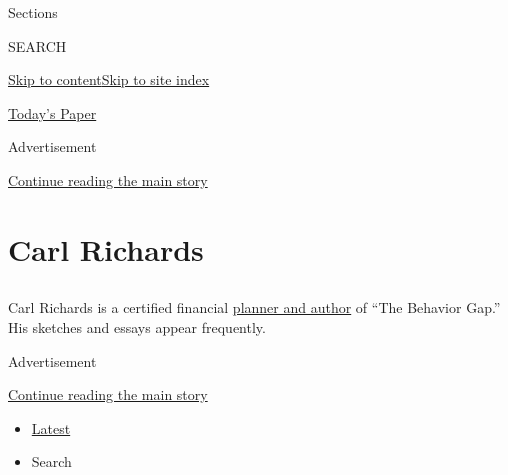 Sections

SEARCH

\protect\hyperlink{site-content}{Skip to
content}\protect\hyperlink{site-index}{Skip to site index}

\href{https://myaccount.nytimes3xbfgragh.onion/auth/login?response_type=cookie\&client_id=vi}{}

\href{https://www.nytimes3xbfgragh.onion/section/todayspaper}{Today's
Paper}

Advertisement

\protect\hyperlink{after-top}{Continue reading the main story}

\hypertarget{carl-richards}{%
\section{Carl Richards}\label{carl-richards}}

\subsection{}

Carl Richards is a certified financial
\href{https://behaviorgap.com}{planner and author} of ``The Behavior
Gap.'' His sketches and essays appear frequently.~

Advertisement

\protect\hyperlink{after-mid1}{Continue reading the main story}

\begin{itemize}
\tightlist
\item
  \protect\hyperlink{stream-panel}{Latest}
\item
  Search
\end{itemize}

